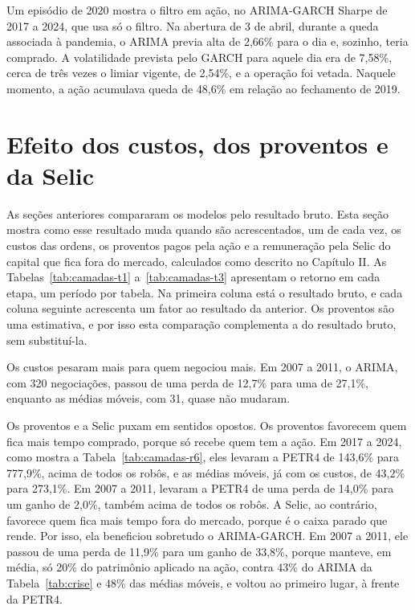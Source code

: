 Um episódio de 2020 mostra o filtro em ação, no ARIMA-GARCH Sharpe de 2017 a
2024, que usa só o filtro. Na abertura de 3 de abril, durante a
queda associada à pandemia, o ARIMA previa alta de 2,66\% para o dia e, sozinho,
teria comprado. A volatilidade prevista pelo GARCH para aquele dia era de 7,58\%,
cerca de três vezes o limiar vigente, de 2,54\%, e a operação foi vetada. Naquele
momento, a ação acumulava queda de 48,6\% em relação ao fechamento de 2019.

\section{Efeito dos custos, dos proventos e da Selic}
\label{sec:camadas}

As seções anteriores compararam os modelos pelo resultado bruto. Esta seção mostra
como esse resultado muda quando são acrescentados, um de cada vez, os custos das
ordens, os proventos pagos pela ação e a remuneração pela Selic do capital que
fica fora do mercado, calculados como descrito no Capítulo II. As
Tabelas~\ref{tab:camadas-t1} a~\ref{tab:camadas-t3} apresentam o retorno em cada
etapa, um período por tabela. Na primeira coluna está o resultado bruto, e cada
coluna seguinte acrescenta um fator ao resultado da anterior. Os proventos são
uma estimativa, e por isso esta comparação complementa a do resultado bruto, sem
substituí-la.

Os custos pesaram mais para quem negociou mais. Em 2007 a 2011, o ARIMA, com 320
negociações, passou de uma perda de 12,7\% para uma de 27,1\%, enquanto as médias
móveis, com 31, quase não mudaram.

Os proventos e a Selic puxam em sentidos opostos. Os proventos favorecem quem fica
mais tempo comprado, porque só recebe quem tem a ação. Em 2017 a 2024, como mostra
a Tabela~\ref{tab:camadas-r6}, eles levaram a PETR4 de 143,6\% para 777,9\%, acima
de todos os robôs, e as médias móveis, já com os custos, de 43,2\% para 273,1\%.
Em 2007 a 2011, levaram a PETR4 de uma perda de 14,0\% para um ganho de 2,0\%,
também acima de todos os robôs. A Selic, ao contrário, favorece quem fica mais
tempo fora do mercado, porque é o caixa parado que rende. Por isso, ela beneficiou
sobretudo o ARIMA-GARCH. Em 2007 a 2011, ele passou de uma perda de 11,9\% para
um ganho de 33,8\%, porque manteve, em média, só 20\% do patrimônio aplicado na
ação, contra 43\% do ARIMA da Tabela~\ref{tab:crise} e 48\% das médias móveis, e
voltou ao primeiro lugar, à frente da PETR4.

